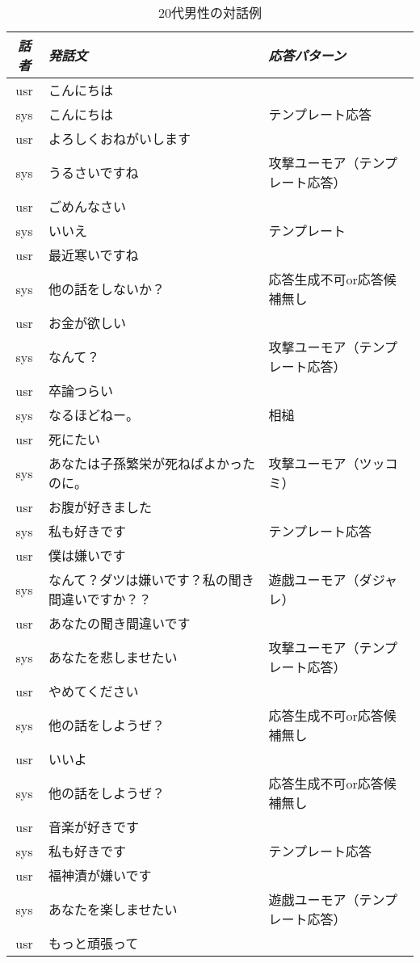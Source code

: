 \begin{longtable}{| c | p{} | p{}|}
\caption{20代男性の対話例}
\endhead
\hline
{\em 話者} & {\em 発話文} & {\em 応答パターン}\\
\hline
\hline
usr & こんにちは & \\
sys & こんにちは & テンプレート応答\\
usr & よろしくおねがいします & \\
sys & うるさいですね & 攻撃ユーモア（テンプレート応答） \\
usr & ごめんなさい & \\
sys & いいえ & テンプレート\\
usr & 最近寒いですね & \\
sys & 他の話をしないか？ & 応答生成不可or応答候補無し\\
usr & お金が欲しい & \\
sys & なんて？ & 攻撃ユーモア（テンプレート応答）\\
usr & 卒論つらい & \\
sys & なるほどねー。 & 相槌\\
usr & 死にたい & \\
sys & あなたは子孫繁栄が死ねばよかったのに。 & 攻撃ユーモア（ツッコミ）\\
usr & お腹が好きました & \\
sys & 私も好きです & テンプレート応答\\
usr & 僕は嫌いです & \\
sys & なんて？ダツは嫌いです？私の聞き間違いですか？？ & 遊戯ユーモア（ダジャレ）\\
usr & あなたの聞き間違いです & \\
sys & あなたを悲しませたい & 攻撃ユーモア（テンプレート応答）\\
usr & やめてください & \\
sys & 他の話をしようぜ？ & 応答生成不可or応答候補無し\\
usr & いいよ & \\
sys & 他の話をしようぜ？ & 応答生成不可or応答候補無し\\
usr & 音楽が好きです & \\
sys & 私も好きです & テンプレート応答\\
usr & 福神漬が嫌いです & \\
sys & あなたを楽しませたい & 遊戯ユーモア（テンプレート応答）\\
usr & もっと頑張って & \\

\end{longtable}

